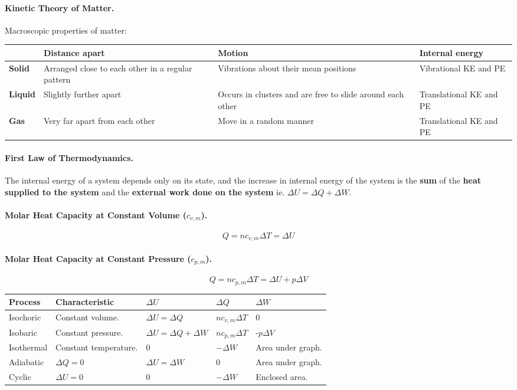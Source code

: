 \documentclass{article}
\begin{document}
\paragraph{Kinetic Theory of Matter.} Macroscopic properties of matter:

\begin{tabular}{|l|p{5cm}|p{5cm}|p{5cm}|} \hline & \textbf{Distance apart} &
  \textbf{Motion} & \textbf{Internal energy} \\ \hline \textbf{Solid} & Arranged
  close to each other in a regular pattern & Vibrations about their mean
  positions & Vibrational KE and PE \\ \textbf{Liquid} & Slightly further apart
  & Occurs in clusters and are free to slide around each other & Translational
  KE and PE \\ \textbf{Gas} & Very far apart from each other & Move in a random
  manner & Translational KE and PE \\ \hline \end{tabular}

\paragraph{First Law of Thermodynamics.} The internal energy of a system depends
only on its state, and the increase in internal energy of the system is the
\textbf{sum} of the \textbf{heat supplied to the system} and the
\textbf{external work done on the system} ie. $\Delta U = \Delta Q + \Delta W$.

\paragraph{Molar Heat Capacity at Constant Volume ($c_{v,m}$).} \begin{equation}
Q = nc_{v,m}\Delta T = \Delta U \end{equation}

\paragraph{Molar Heat Capacity at Constant Pressure ($c_{p,m}$).}
\begin{equation} Q = nc_{p,m}\Delta T = \Delta U + p\Delta V \end{equation}

\begin{tabular}{|l|l|l|l|l|} \hline \textbf{Process} & \textbf{Characteristic} &
  $\Delta U$ & $\Delta Q$ & $\Delta W$ \\ \hline Isochoric & Constant volume. &
  $\Delta U = \Delta Q$ & $nc_{v,m}\Delta T$ & 0 \\ Isobaric & Constant
  pressure. & $\Delta U = \Delta Q + \Delta W$ & $nc_{p,m}\Delta T$ & -$p\Delta
  V$ \\ Isothermal & Constant temperature. & 0 & $-\Delta W$ & Area under graph.
\\ Adiabatic & $\Delta Q = 0$ & $\Delta U = \Delta W$ & 0 & Area under graph. \\
Cyclic & $\Delta U = 0$ & 0 & $-\Delta W$ & Enclosed area. \\ \hline
\end{tabular}
\end{document}
